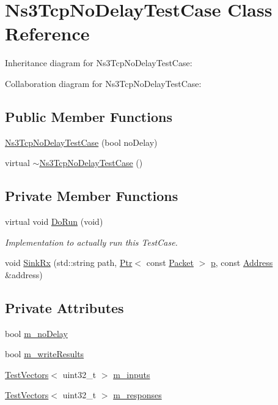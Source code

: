 \hypertarget{classNs3TcpNoDelayTestCase}{}\section{Ns3\+Tcp\+No\+Delay\+Test\+Case Class Reference}
\label{classNs3TcpNoDelayTestCase}


Inheritance diagram for Ns3\+Tcp\+No\+Delay\+Test\+Case\+:


Collaboration diagram for Ns3\+Tcp\+No\+Delay\+Test\+Case\+:
\subsection*{Public Member Functions}
\begin{DoxyCompactItemize}
\item 
\hyperlink{classNs3TcpNoDelayTestCase_a119433189596e2bc8bd55f619ee3fdcd}{Ns3\+Tcp\+No\+Delay\+Test\+Case} (bool no\+Delay)
\item 
virtual \hyperlink{classNs3TcpNoDelayTestCase_a06b410ed248dc6c7f8ce2352cda2eeda}{$\sim$\+Ns3\+Tcp\+No\+Delay\+Test\+Case} ()
\end{DoxyCompactItemize}
\subsection*{Private Member Functions}
\begin{DoxyCompactItemize}
\item 
virtual void \hyperlink{classNs3TcpNoDelayTestCase_abfdf89fdc70c1f4b66390d31fcc6013b}{Do\+Run} (void)
\begin{DoxyCompactList}\small\item\em Implementation to actually run this Test\+Case. \end{DoxyCompactList}\item 
void \hyperlink{classNs3TcpNoDelayTestCase_a8d324503d7c607dd07683cda5dfd4395}{Sink\+Rx} (std\+::string path, \hyperlink{classns3_1_1Ptr}{Ptr}$<$ const \hyperlink{classns3_1_1Packet}{Packet} $>$ \hyperlink{lte__link__budget__x2__handover__measures_8m_ac9de518908a968428863f829398a4e62}{p}, const \hyperlink{classns3_1_1Address}{Address} \&address)
\end{DoxyCompactItemize}
\subsection*{Private Attributes}
\begin{DoxyCompactItemize}
\item 
bool \hyperlink{classNs3TcpNoDelayTestCase_a630f94f010787d170954d890507cade3}{m\+\_\+no\+Delay}
\item 
bool \hyperlink{classNs3TcpNoDelayTestCase_adb11f9f140fb604fbf06c2aaea180656}{m\+\_\+write\+Results}
\item 
\hyperlink{classns3_1_1TestVectors}{Test\+Vectors}$<$ uint32\+\_\+t $>$ \hyperlink{classNs3TcpNoDelayTestCase_af1f531d733f12dc50d33ef58da25d27f}{m\+\_\+inputs}
\item 
\hyperlink{classns3_1_1TestVectors}{Test\+Vectors}$<$ uint32\+\_\+t $>$ \hyperlink{classNs3TcpNoDelayTestCase_ab02cb2b5922156135bbe2580528cb590}{m\+\_\+responses}
\end{DoxyCompactItemize}
